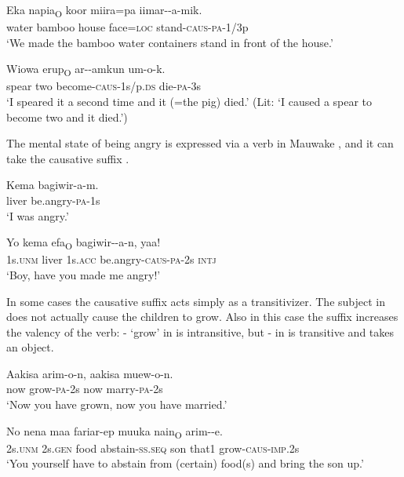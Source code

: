 \ea%
\label{ex:3:x998}
\gll {\ob}Eka napia{\cb}\textsubscript{O} koor miira=pa iimar--a-mik. \\
water bamboo house face=\textsc{loc} stand-\textsc{caus}-\textsc{pa}-1/3p\\
\glt`We made the bamboo water containers stand in front of the house.'
\z

\ea%
\label{ex:3:x992}
\gll {\ob}Wiowa erup{\cb}\textsubscript{O} ar--amkun um-o-k. \\
spear two become-\textsc{caus}-1s/p.\textsc{ds} die-\textsc{pa}-3s\\
\glt`I speared it a second time and it (=the pig) died.' (Lit: `I caused a spear to become two and it died.')
\z

The mental state of being angry is expressed via a verb in Mauwake , and it can take the causative suffix .

\ea%
\label{ex:3:x993}
\gll Kema bagiwir-a-m. \\
liver be.angry-\textsc{pa}-1s\\
\glt`I was angry.'
\z

\ea%
\label{ex:3:x994}
\gll Yo kema {\ob}efa{\cb}\textsubscript{O} bagiwir--a-n, yaa! \\
1s.\textsc{unm} liver 1s.\textsc{acc} be.angry-\textsc{caus}-\textsc{pa}-2s \textsc{intj}\\
\glt`Boy, have you made me angry!'
\z

In some cases the causative suffix acts simply as a transitivizer. The subject in  does not actually cause the children to grow. Also in this case the suffix increases the valency of the verb: - `grow' in  is intransitive, but - in  is transitive and takes an object.

\ea%
\label{ex:3:x995}
\gll Aakisa arim-o-n, aakisa muew-o-n. \\
now grow-\textsc{pa}-2s now marry-\textsc{pa}-2s\\
\glt`Now you have grown, now you have married.'
\z

\ea%
\label{ex:3:x996}
\gll No nena maa fariar-ep {\ob}muuka nain{\cb}\textsubscript{O} arim--e.\\
2s.\textsc{unm} 2s.\textsc{gen} food abstain-\textsc{ss}.\textsc{seq} son that1 grow-\textsc{caus}-\textsc{imp}.2s\\
\glt`You yourself have to abstain from (certain) food(s) and bring the son up.'
\z

